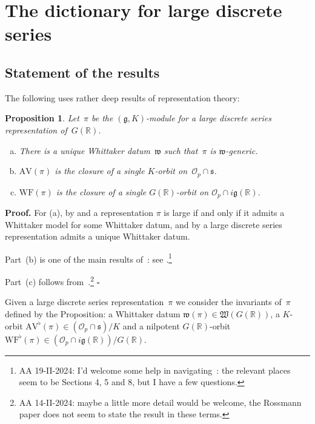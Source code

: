 \documentclass[10pt,leqno]{article}
\newtheorem{proposition}[equation]{Proposition}
\newcommand{\qed}{\hfill $\square$ \medskip}
\newenvironment{proof}[1][Proof]{\noindent\textbf{#1.} }{\qed}
\newcommand{\R}{\mathbb R}
\newcommand{\g}{\mathfrak g}
\newcommand{\AV}{\mathrm{AV}}
\newcommand{\WF}{\mathrm{WF}}
\begin{document}
\section{The dictionary for large discrete series}


\subsection{Statement of the results}  


The following uses rather deep results of representation theory:
\begin{proposition} Let~$\pi$ be the $(\g, K)$-module for a large discrete series representation of~$G(\R)$.  
\begin{enumerate}[(a)]
\item There is a unique Whittaker datum~$\mathfrak{w}$ such that~$\pi$ is $\mathfrak{w}$-generic.
\item $\AV(\pi)$ is the closure of a single $K$-orbit on~$\mathcal{O}_p \cap \mathfrak{s}$.
\item  $\WF(\pi)$ is the closure of a single $G(\R)$-orbit on $\mathcal{O}_p \cap  i \g(\R)$.
\end{enumerate}
\end{proposition}

\begin{proof} For (a), by \cite{vogan-gelfand-kirillov} and \cite{kostant_whittaker}
a representation $\pi$ is large if and only if it admits a Whittaker model for some Whittaker datum,
and by \cite[Lemma 14.14]{abv} a  large discrete series representation admits a unique Whittaker datum.

Part~(b) is one of the main results of~\cite{vogan_bowdoin}: see \cite[Theorem ?]{vogan_bowdoin}.\footnote{AA 19-II-2024: I'd welcome some help in navigating~\cite{vogan_bowdoin}: the relevant places seem to be  Sections 4, 5 and 8, but I have a few questions.}

Part~(c) follows from~\cite{rossmann_limit_orbits}.\footnote{AA 14-II-2024: maybe a little more detail would be welcome, the Rossmann paper does not seem to state the result in these terms.}
\end{proof}

Given a large discrete series representation~$\pi$ we consider the invariants of~$\pi$ defined by the Proposition: a Whittaker datum  $\mathfrak{w}(\pi) \in \mathfrak{W}(G(\R))$, a $K$-orbit $\AV^\flat(\pi) \in (\mathcal{O}_p \cap \mathfrak{s})/K$  and a nilpotent $G(\R)$-orbit $\WF^\flat(\pi) \in (\mathcal{O}_p \cap  i \g(\R))/G(\R)$. 
\end{document}

